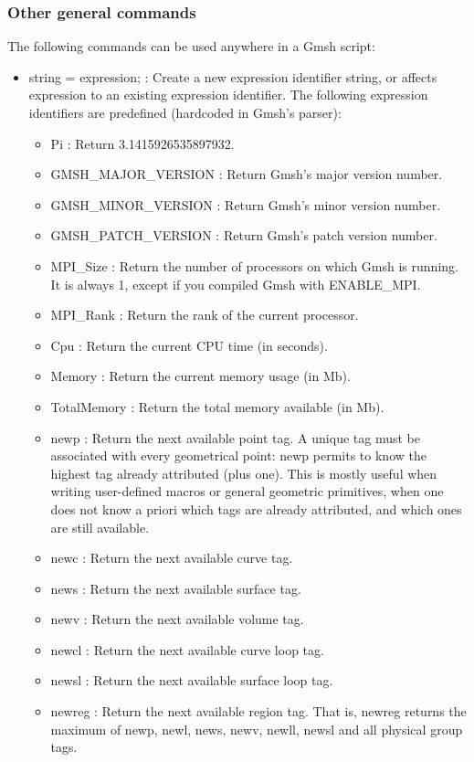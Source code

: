 \documentclass[dvipdfmx, 9pt, a4paper]{article}
\numberwithin{equation}{section}
\begin{document}
\subsubsection{Other general commands}
The following commands can be used anywhere in a Gmsh script:
\begin{itemize}
\item string = expression; : Create a new expression identifier string, or affects expression to an existing expression identifier. The following expression identifiers are predefined (hardcoded in Gmsh's parser):
\begin{itemize}
\item Pi : Return  3.1415926535897932.
\item GMSH\_MAJOR\_VERSION : Return Gmsh's major version number.
\item GMSH\_MINOR\_VERSION : Return Gmsh's minor version number.
\item GMSH\_PATCH\_VERSION : Return Gmsh's patch version number.
\item MPI\_Size : Return the number of processors on which Gmsh is running. It is always 1, except if you compiled Gmsh with ENABLE\_MPI.
\item MPI\_Rank : Return the rank of the current processor.
\item Cpu : Return the current CPU time (in seconds).
\item Memory : Return the current memory usage (in Mb).
\item TotalMemory : Return the total memory available (in Mb).
\item newp : Return the next available point tag. A unique tag must be associated with every geometrical point: newp permits to know the highest tag already attributed (plus one). This is mostly useful when writing user-defined macros or general geometric primitives, when one does not know a priori which tags are already attributed, and which ones are still available.
\item newc : Return the next available curve tag.
\item news : Return the next available surface tag.
\item newv : Return the next available volume tag.
\item newcl : Return the next available curve loop tag.
\item newsl : Return the next available surface loop tag.
\item newreg : Return the next available region tag. That is, newreg returns the maximum of newp, newl, news, newv, newll, newsl and all physical group tags.

\end{itemize}
\end{itemize}
\end{document}
